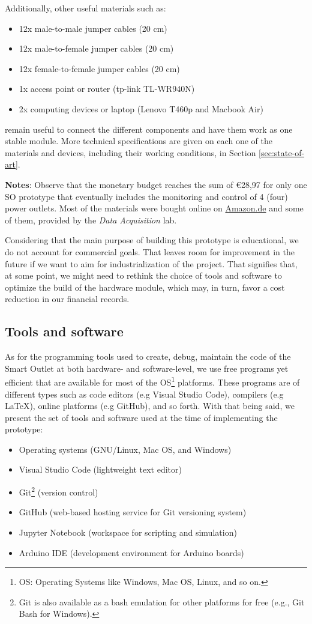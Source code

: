 Additionally, other useful materials such as:
\begin{itemize}
    \item 12x male-to-male jumper cables (20 cm)
    \item 12x male-to-female jumper cables (20 cm)
    \item 12x female-to-female jumper cables (20 cm)
    \item 1x access point or router (tp-link TL-WR940N)
    \item 2x computing devices or laptop (Lenovo T460p and Macbook Air)
\end{itemize}
remain useful to connect the different components and have them work as one stable module. More technical specifications are given on each one of the materials and devices, including their working conditions, in Section \ref{sec:state-of-art}.

\noindent
\textbf{Notes}: Observe that the monetary budget reaches the sum of \euro{28,97} for only one SO prototype that eventually includes the monitoring and control of 4 (four) power outlets. Most of the materials were bought online on \href{https://www.amazon.de/}{Amazon.de} and some of them, provided by the \emph{Data Acquisition} lab.

Considering that the main purpose of building this prototype is educational, we
do not account for commercial goals. That leaves room for improvement in the
future if we want to aim for industrialization of the project. That signifies
that, at some point, we might need to rethink the choice of tools and software
to optimize the build of the hardware module, which may, in turn, favor
a cost reduction in our financial records.

\subsection{Tools and software}
As for the programming tools used to create, debug, maintain the code of the Smart
Outlet at both hardware- and software-level, we use free programs yet efficient
that are available for most of the OS\footnote{OS: Operating Systems like
Windows, Mac OS, Linux, and so on.} platforms. These programs are of different
types such as code editors (e.g Visual Studio Code), compilers (e.g LaTeX),
online platforms (e.g GitHub), and so forth. With that being said, we present
the set of tools and software used at the time of implementing the prototype:
\begin{itemize}
    \item Operating systems (GNU/Linux, Mac OS, and Windows)
    \item Visual Studio Code (lightweight text editor)
    \item Git\footnote{Git is also available as a bash emulation for other platforms for free (e.g., Git Bash for Windows).} (version control)
    \item GitHub (web-based hosting service for Git versioning system)
    \item Jupyter Notebook (workspace for scripting and simulation)
    \item Arduino IDE (development environment for Arduino boards)
\end{itemize}

